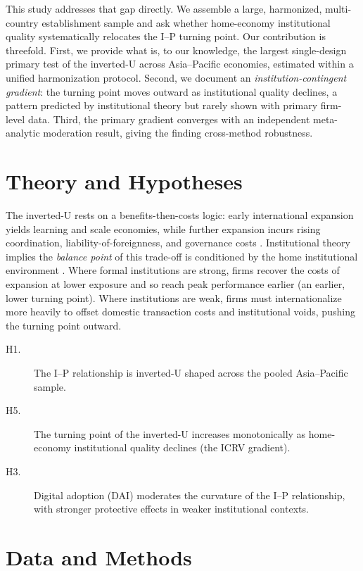 \documentclass[12pt,a4paper]{article}
\begin{document}
This study addresses that gap directly. We assemble a large, harmonized,
multi-country establishment sample and ask whether home-economy institutional
quality systematically relocates the I--P turning point. Our contribution is
threefold. First, we provide what is, to our knowledge, the largest
single-design primary test of the inverted-U across Asia--Pacific economies,
estimated within a unified harmonization protocol. Second, we document an
\emph{institution-contingent gradient}: the turning point moves outward as
institutional quality declines, a pattern predicted by institutional theory
but rarely shown with primary firm-level data. Third, the primary gradient
converges with an independent meta-analytic moderation result, giving the
finding cross-method robustness.

\section{Theory and Hypotheses}
The inverted-U rests on a benefits-then-costs logic: early international
expansion yields learning and scale economies, while further expansion incurs
rising coordination, liability-of-foreignness, and governance costs
\citep{lubeamish2004,contractor2012}. Institutional theory implies the
\emph{balance point} of this trade-off is conditioned by the home
institutional environment \citep{north1990,khanna2010,marano2016}. Where
formal institutions are strong, firms recover the costs of expansion at lower
exposure and so reach peak performance earlier (an earlier, lower turning
point). Where institutions are weak, firms must internationalize more heavily
to offset domestic transaction costs and institutional voids, pushing the
turning point outward.

\begin{description}
\item[H1.] The I--P relationship is inverted-U shaped across the pooled
Asia--Pacific sample.
\item[H5.] The turning point of the inverted-U increases monotonically as
home-economy institutional quality declines (the ICRV gradient).
\item[H3.] Digital adoption (DAI) moderates the curvature of the I--P
relationship, with stronger protective effects in weaker institutional
contexts.
\end{description}

\section{Data and Methods}
\end{document}
